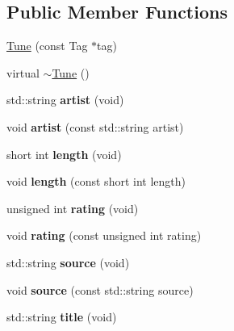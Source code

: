 \subsection*{Public Member Functions}
\begin{DoxyCompactItemize}
\item 
\hyperlink{classTune_ae529cd6723c41e9dd9fa2087472bf6d9}{Tune} (const Tag $\ast$tag)
\item 
virtual \hyperlink{classTune_a0967da69eda67c3e39c4d23d18e9256f}{$\sim$Tune} ()
\item 
\hypertarget{classTune_a9dcfd23810724ca1882a7b9e7846120d}{
std::string {\bfseries artist} (void)}
\label{classTune_a9dcfd23810724ca1882a7b9e7846120d}

\item 
\hypertarget{classTune_a933f47fa17caf16d8225b01c3e298750}{
void {\bfseries artist} (const std::string artist)}
\label{classTune_a933f47fa17caf16d8225b01c3e298750}

\item 
\hypertarget{classTune_a8355c0cdd1f3c96fcfe1afb4b896c98d}{
short int {\bfseries length} (void)}
\label{classTune_a8355c0cdd1f3c96fcfe1afb4b896c98d}

\item 
\hypertarget{classTune_af2beb40bbe27582b18f9645375e64fc2}{
void {\bfseries length} (const short int length)}
\label{classTune_af2beb40bbe27582b18f9645375e64fc2}

\item 
\hypertarget{classTune_a08839a0958ee658e7af0081104424d7e}{
unsigned int {\bfseries rating} (void)}
\label{classTune_a08839a0958ee658e7af0081104424d7e}

\item 
\hypertarget{classTune_a7ca64041cd886dedeca295b7fc5542b5}{
void {\bfseries rating} (const unsigned int rating)}
\label{classTune_a7ca64041cd886dedeca295b7fc5542b5}

\item 
\hypertarget{classTune_accf645b05ae6aa81d910cd110003a603}{
std::string {\bfseries source} (void)}
\label{classTune_accf645b05ae6aa81d910cd110003a603}

\item 
\hypertarget{classTune_ad86a4f895a6d65a91c958a30a01911af}{
void {\bfseries source} (const std::string source)}
\label{classTune_ad86a4f895a6d65a91c958a30a01911af}

\item 
\hypertarget{classTune_a7dd0a0292a894d1d925a4fc4fa4d8401}{
std::string {\bfseries title} (void)}
\label{classTune_a7dd0a0292a894d1d925a4fc4fa4d8401}


\end{DoxyCompactItemize}
